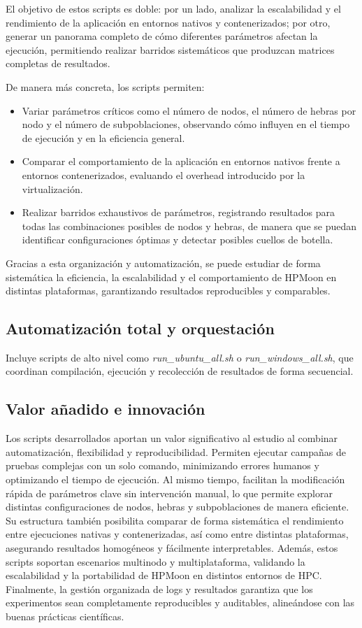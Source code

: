 El objetivo de estos scripts es doble: por un lado, analizar la escalabilidad y el rendimiento de la aplicación en entornos nativos y contenerizados; por otro, generar un panorama completo de cómo diferentes parámetros afectan la ejecución, permitiendo realizar barridos sistemáticos que produzcan matrices completas de resultados.

De manera más concreta, los scripts permiten:

\begin{itemize}
    \item Variar parámetros críticos como el número de nodos, el número de hebras por nodo y el número de subpoblaciones, observando cómo influyen en el tiempo de ejecución y en la eficiencia general.
    \item Comparar el comportamiento de la aplicación en entornos nativos frente a entornos contenerizados, evaluando el overhead introducido por la virtualización.
    \item Realizar barridos exhaustivos de parámetros, registrando resultados para todas las combinaciones posibles de nodos y hebras, de manera que se puedan identificar configuraciones óptimas y detectar posibles cuellos de botella.
\end{itemize}

Gracias a esta organización y automatización, se puede estudiar de forma sistemática la eficiencia, la escalabilidad y el comportamiento de HPMoon en distintas plataformas, garantizando resultados reproducibles y comparables.

\subsection{Automatización total y orquestación}
Incluye scripts de alto nivel como \textit{run\_ubuntu\_all.sh} o \textit{run\_windows\_all.sh}, que coordinan compilación, ejecución y recolección de resultados de forma secuencial.

\subsection{Valor añadido e innovación}

Los scripts desarrollados aportan un valor significativo al estudio al combinar automatización, flexibilidad y reproducibilidad. Permiten ejecutar campañas de pruebas complejas con un solo comando, minimizando errores humanos y optimizando el tiempo de ejecución. Al mismo tiempo, facilitan la modificación rápida de parámetros clave sin intervención manual, lo que permite explorar distintas configuraciones de nodos, hebras y subpoblaciones de manera eficiente. Su estructura también posibilita comparar de forma sistemática el rendimiento entre ejecuciones nativas y contenerizadas, así como entre distintas plataformas, asegurando resultados homogéneos y fácilmente interpretables. Además, estos scripts soportan escenarios multinodo y multiplataforma, validando la escalabilidad y la portabilidad de HPMoon en distintos entornos de HPC. Finalmente, la gestión organizada de logs y resultados garantiza que los experimentos sean completamente reproducibles y auditables, alineándose con las buenas prácticas científicas.

